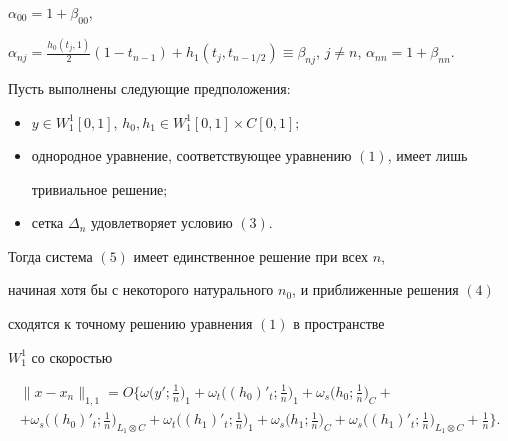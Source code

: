 $\alpha_{00}=1+\beta_{00}$,


$\alpha_{nj}=\frac{h_0(t_j,1)}{2}(1-t_{n-1})+h_1(t_j,t_{n-1/2})\equiv


\beta_{nj}$, $j\ne n$, $\alpha_{nn}=1+\beta_{nn}$.








\begin{thmnonum}


Пусть выполнены следующие предположения\/${:}$


\begin{itemize}


\item[1)] $y\in W_1^1[0,1]$, $h_0,h_1\in W_1^1[0,1]\times C[0,1];$


\item[2)] однородное уравнение, соответствующее уравнению $(1)$, имеет лишь


тривиальное ре\-ше\-ние$;$


\item[3)] сетка $\Delta_n$ удовлетворяет условию $(3)$.


\end{itemize}





Тогда система $(5)$ имеет единственное решение при всех $n$,


начиная хотя бы с некоторого натурального $n_0$, и приближенные решения $(4)$


сходятся к точному решению уравнения $(1)$ в пространстве


$W_1^1$ со скоростью


\begin{multline*}


\|x-x_n\|_{1,1}=O\bigg\{\omega\bigg(y';\frac{1}{n}\bigg)_1+


\omega_t\bigg((h_0)'_t;\frac{1}{n}\bigg)_1+


\omega_s\bigg(h_0;\frac{1}{n}\bigg)_C + \\


%


+\omega_s\bigg((h_0)'_t;\frac{1}{n}\bigg)_{L_1\otimes C}


+\omega_t\bigg((h_1)'_t;\frac{1}{n}\bigg)_1+


\omega_s\bigg(h_1;\frac{1}{n}\bigg)_C +


\omega_s\bigg((h_1)'_t;\frac{1}{n}\bigg)_{L_1\otimes C}+\frac{1}{n}\bigg\}.


\end{multline*}


\end{thmnonum}








